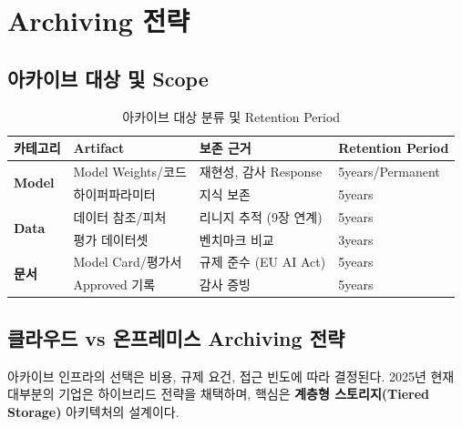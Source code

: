 \section{Archiving 전략}
\label{sec:12.3}

\subsection{아카이브 대상 및 Scope}
\label{sec:12.3.1}

\begin{table}[htbp]
\centering
\caption{아카이브 대상 분류 및 Retention Period}
\label{tab:archive_scope}
\small
\begin{tabularx}{\textwidth}{p{2cm}p{2.5cm}X p{2.5cm}}
\toprule
\textbf{카테고리} & \textbf{Artifact} & \textbf{보존 근거} & \textbf{Retention Period} \\
\midrule
\multirow{2}{*}{\textbf{Model}} &
Model Weights/코드 &
재현성, 감사 Response &
5years/Permanent \\
\cmidrule{2-4}
& 하이퍼파라미터 &
지식 보존 &
5years \\
\midrule
\multirow{2}{*}{\textbf{Data}} &
데이터 참조/피처 &
리니지 추적 (9장 연계) &
5years \\
\cmidrule{2-4}
& 평가 데이터셋 &
벤치마크 비교 &
3years \\
\midrule
\multirow{2}{*}{\textbf{문서}} &
Model Card/평가서 &
규제 준수 (EU AI Act) &
5years \\
\cmidrule{2-4}
& Approved 기록 &
감사 증빙 &
5years \\
\bottomrule
\end{tabularx}
\end{table}

\subsection{클라우드 vs 온프레미스 Archiving 전략}
\label{sec:12.3.1b}

아카이브 인프라의 선택은 비용, 규제 요건, 접근 빈도에 따라 결정된다. 2025년 현재 대부분의 기업은 하이브리드 전략을 채택하며, 핵심은 \textbf{계층형 스토리지(Tiered Storage)} 아키텍처의 설계이다.


